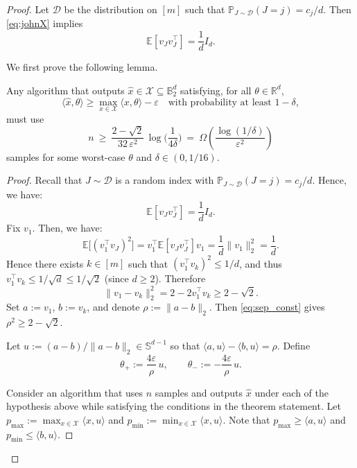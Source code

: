 \begin{proof}
Let $\mathcal{D}$ be the distribution on $[m]$ such that $\mathbb{P}_{J\sim \mathcal{D}}(J=j)=c_j/d$.
Then \eqref{eq:johnX} implies
\begin{equation}\label{eq:cov}
\mathbb{E}[v_J v_J^\top] = \frac{1}{d}I_d.
\end{equation}

We first prove the following lemma.
\begin{lemma}\label{lem:baseline}
Any algorithm that outputs $\widehat x\in\mathcal{X}\subseteq \mathbb{B}_2^d$ satisfying, for all $\theta\in\mathbb{R}^d$,
\[
\langle \widehat x,\theta\rangle \ge \max_{x\in \mathcal X}\langle x,\theta\rangle-\varepsilon
\quad\text{with probability at least } 1-\delta,
\]
must use
\[
n \ \ge\ \frac{2-\sqrt{2}}{32\,\varepsilon^2}\,\log\!\Big(\frac{1}{4\delta}\Big)
\ =\ \Omega\!\left(\frac{\log(1/\delta)}{\varepsilon^2}\right)
\]
samples for some worst-case $\theta$ and $\delta\in(0,1/16)$.
\end{lemma}
\begin{proof}
Recall that $J\sim\mathcal{D}$ is a random index with $\mathbb{P}_{J\sim \mathcal{D}}(J=j)=c_j/d$.
Hence, we have:
\[
\mathbb E[v_J v_J^\top] = \frac{1}{d}I_d.
\]
Fix $v_1$. Then, we have:
\[
\mathbb E\big[(v_1^\top v_J)^2\big]
= v_1^\top \mathbb E[v_J v_J^\top] v_1
= \frac{1}{d}\|v_1\|_2^2
= \frac{1}{d}.
\]
Hence there exists $k\in[m]$ such that $(v_1^\top v_k)^2\le 1/d$, and thus
$v_1^\top v_k \le 1/\sqrt{d}\le 1/\sqrt{2}$ (since $d\ge 2$).
Therefore
\begin{equation}\label{eq:sep_const}
\|v_1-v_k\|_2^2
=2-2v_1^\top v_k
\ge 2-\sqrt{2}.
\end{equation}
Set $a:=v_1$, $b:=v_k$, and denote $\rho := \|a-b\|_2$. Then \eqref{eq:sep_const} gives $\rho^2\ge 2-\sqrt{2}$.

\noindent
Let $u := (a-b)/\|a-b\|_2 \in \mathbb S^{d-1}$ so that $\langle a,u\rangle-\langle b,u\rangle=\rho$.
Define
\[
\theta_+ := \frac{4\varepsilon}{\rho}\,u,
\qquad
\theta_- := -\frac{4\varepsilon}{\rho}\,u.
\]

Consider an algorithm that uses $n$ samples and outputs $\widehat x$ under each of the hypothesis above while satisfying the conditions in the theorem statement.
Let $p_{\max}:=\max_{x\in\mathcal X}\langle x,u\rangle$ and $p_{\min}:=\min_{x\in\mathcal X}\langle x,u\rangle$.
Note that $p_{\max}\ge \langle a,u\rangle$ and $p_{\min}\le \langle b,u\rangle$.


\end{proof}
\end{proof}
